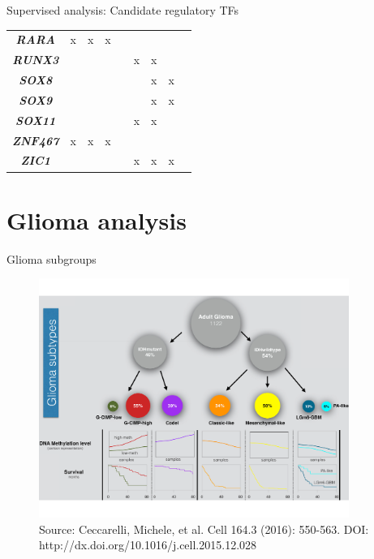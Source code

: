 \documentclass[slidestop,compress,11pt,xcolor=dvipsnames]{beamer}
\begin{document}
\begin{frame}{Supervised analysis: Candidate regulatory TFs }
\begin{table}[]
\begin{tabular}{@{}|c|c|c|c|c|c|c|c|c|@{}}
\textit{\textbf{RARA}} & x & x & x &  &  &  &  &  \\
\textit{\textbf{RUNX3}} &  &  &  &  & x & x &  &  \\
\textit{\textbf{SOX8}} &  &  &  &  &  & x & x &  \\
\textit{\textbf{SOX9}} &  &  &  &  &  & x & x &  \\
\textit{\textbf{SOX11}} &  &  &  &  & x & x &  &  \\
\textit{\textbf{ZNF467}} & x & x & x &  &  &  &  &  \\
\textit{\textbf{ZIC1}} &  &  &  &  & x & x & x &  \\ \bottomrule
\end{tabular}
\end{table}
\end{frame}


\section{Glioma analysis}


\begin{frame}{Glioma subgroups}
\vspace{-0.5cm}
 \begin{figure}[ht!]
  \centering
  \includegraphics[width=0.9\textwidth]{glioma/figure1.pdf}{\tiny{\\Source: Ceccarelli, Michele, et al. Cell 164.3 (2016): 550-563. DOI: http://dx.doi.org/10.1016/j.cell.2015.12.028}}
 \end{figure}
\end{frame}
\end{document}
